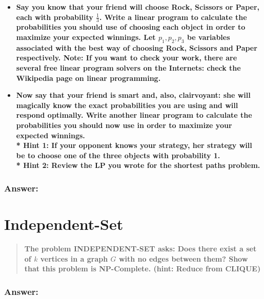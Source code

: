 \documentclass[titlepage]{article}\usepackage[]{graphicx}\usepackage[]{color}
\begin{document}
  \begin{itemize}
    \item \textbf{Say you know that your friend will choose Rock, Scissors or
        Paper, each with probability $\frac{1}{3}$. Write a linear program to
        calculate the probabilities you should use of choosing each object in
        order to maximize your expected winnings. Let $p_1,p_2,p_3$ be variables
        associated with the best way of choosing Rock, Scissors and Paper
        respectively. Note: If you want to check your work, there are several free
        linear program solvers on the Internets: check the Wikipedia page on linear
        programming.} 
      \item \textbf{Now say that your friend is smart and, also,
        clairvoyant: she will magically know the exact probabilities you are
        using and will respond optimally. Write another linear program to
        calculate the probabilities you should now use in order to maximize your
        expected winnings. \\* Hint 1: If your opponent knows your strategy, her
        strategy will be to choose one of the three objects with probability 1.
      \\* Hint 2: Review the LP you wrote for the shortest paths problem.}
  \end{itemize}
  \subsubsection{Answer:}

  \vspace{9cm}

\section{Independent-Set}
  \begin{quote}
  \textbf{The problem INDEPENDENT-SET asks: Does there exist a set of $k$
  vertices in a graph $G$ with no edges between them? Show that this problem is
  NP-Complete. (hint: Reduce from CLIQUE)}
  \end{quote}
  \subsubsection{Answer:}

  \vspace{9cm}
\end{document}
